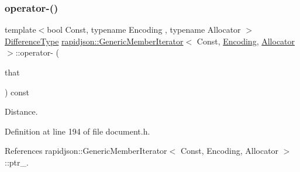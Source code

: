 \subsubsection{\texorpdfstring{operator-\/()}{operator-()}\hspace{0.1cm}{\footnotesize\ttfamily [2/2]}}
{\footnotesize\ttfamily template$<$bool Const, typename Encoding , typename Allocator $>$ \\
\mbox{\hyperlink{classrapidjson_1_1_generic_member_iterator_aff2739a9265639a7a4be8c3e6216b31a}{Difference\+Type}} \mbox{\hyperlink{classrapidjson_1_1_generic_member_iterator}{rapidjson\+::\+Generic\+Member\+Iterator}}$<$ Const, \mbox{\hyperlink{classrapidjson_1_1_encoding}{Encoding}}, \mbox{\hyperlink{classrapidjson_1_1_allocator}{Allocator}} $>$\+::operator-\/ (\begin{DoxyParamCaption}\item[{\mbox{\hyperlink{classrapidjson_1_1_generic_member_iterator_a61b9a9ba8a5917d90406532f104605cc}{Const\+Iterator}}}]{that }\end{DoxyParamCaption}) const}



Distance. 



Definition at line 194 of file document.\+h.


\begin{DoxyCode}{0}

\end{DoxyCode}


References rapidjson\+::\+Generic\+Member\+Iterator$<$ Const, Encoding, Allocator $>$\+::ptr\+\_\+.

\mbox{\label{classrapidjson_1_1_generic_member_iterator_a5b29025a0fe480332fa24922ef5852c0}} 
